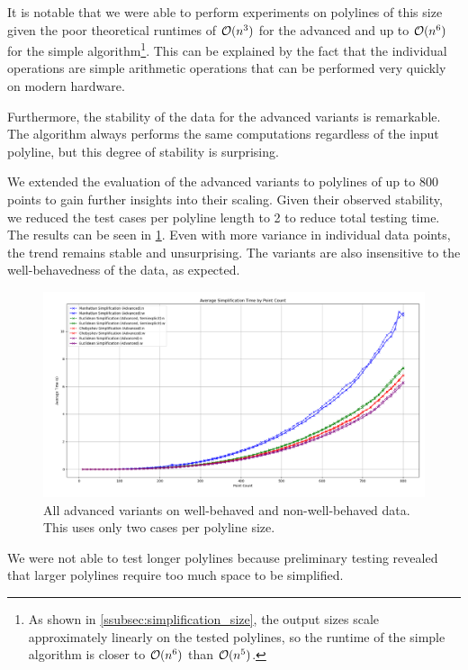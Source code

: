 It is notable that we were able to perform experiments on polylines of this size given the poor theoretical runtimes of \(\mathcal{O}(n^3)\) for the advanced and up to \(\mathcal{O}(n^6)\) for the simple algorithm\footnote{As shown in \cref{ssubsec:simplification_size}, the output sizes scale approximately linearly on the tested polylines, so the runtime of the simple algorithm is closer to \(\mathcal{O}(n^6)\) than \(\mathcal{O}(n^5)\).}. This can be explained by the fact that the individual operations are simple arithmetic operations that can be performed very quickly on modern hardware.

Furthermore, the stability of the data for the advanced variants is remarkable. The \citeauthor{polyline_simplification_has_cubic_complexity_bringmannetal} algorithm always performs the same computations regardless of the input polyline, but this degree of stability is surprising.

We extended the evaluation of the advanced variants to polylines of up to 800 points to gain further insights into their scaling. Given their observed stability, we reduced the test cases per polyline length to 2 to reduce total testing time. The results can be seen in \cref{fig:res_advanced800}. Even with more variance in individual data points, the trend remains stable and unsurprising. The variants are also insensitive to the well-behavedness of the data, as expected.

\begin{figure}[b]
  \centering
	\includegraphics[scale=0.4]{./figures/res_advanced800.png}
  \caption{All advanced variants on well-behaved and non-well-behaved data. This uses only two cases per polyline size.}
  \label{fig:res_advanced800}
\end{figure}

We were not able to test longer polylines because preliminary testing revealed that larger polylines require too much space to be simplified.

